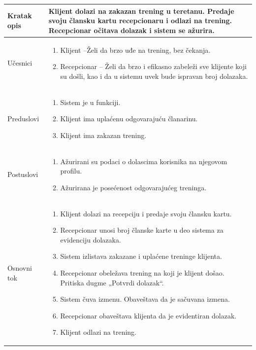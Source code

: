 \documentclass[../main.tex]{subfiles}
\begin{document}
\begin{longtable}{| p{} | p{} |} 
\hline
    Kratak opis &  Klijent dolazi na zakazan trening u teretanu. Predaje svoju člansku kartu recepcionaru i odlazi na trening. Recepcionar očitava dolazak i sistem se ažurira.\\ 
\hline    
    Učesnici & \begin{enumerate}
        \item Klijent –Želi da brzo uđe na trening, bez čekanja.
        \item Recepcionar – Želi da brzo i efikasno zabeleži sve klijente koji su došli, kao i da u sistemu uvek bude ispravan broj dolazaka.   
     \end{enumerate}\\
\hline
   Preduslovi & \begin{enumerate}
       \item Sistem je u funkciji.
       \item Klijent ima uplaćenu odgovarajuću članarinu.
       \item Klijent ima zakazan trening.
   \end{enumerate}\\
\hline  
    Postuslovi & \begin{enumerate}
        \item Ažurirani su podaci o dolascima korisnika na njegovom profilu.
        \item Ažurirana je posećenost odgovarajućeg treninga.
    \end{enumerate}\\
\hline
    Osnovni tok & \begin{enumerate}
        \item Klijent dolazi na recepciju i predaje svoju člansku kartu.
        \item Recepcionar unosi broj članske karte u deo sistema za evidenciju dolazaka.
        \item Sistem izlistava zakazane i uplaćene treninge klijenta.
        \item Recepcionar obeležava trening na koji je klijent došao. Pritiska dugme „Potvrdi dolazak“.
        \item Sistem čuva izmenu. Obaveštava da je sačuvana izmena.
        \item Recepcionar obaveštava klijenta da je evidentiran dolazak.
        \item Klijent odlazi na trening.

\end{enumerate}
\end{longtable}
\end{document}
